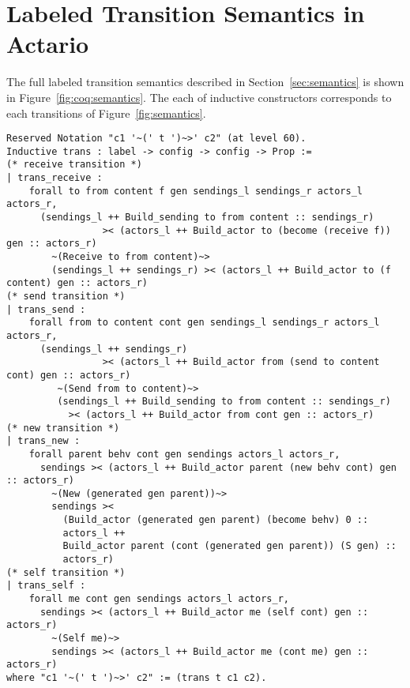 \appendix
\section{Labeled Transition Semantics in Actario}\label{app:lts}
The full labeled transition semantics described in Section~\ref{sec:semantics} is shown in Figure~\ref{fig:coq:semantics}.
The each of inductive constructors corresponds to each transitions of Figure~\ref{fig:semantics}.
\begin{figure*}[tb]
\begin{lstlisting}[style=small]
Reserved Notation "c1 '~(' t ')~>' c2" (at level 60).
Inductive trans : label -> config -> config -> Prop :=
(* receive transition *)
| trans_receive :
    forall to from content f gen sendings_l sendings_r actors_l actors_r,
      (sendings_l ++ Build_sending to from content :: sendings_r)
                 >< (actors_l ++ Build_actor to (become (receive f)) gen :: actors_r)
        ~(Receive to from content)~>
        (sendings_l ++ sendings_r) >< (actors_l ++ Build_actor to (f content) gen :: actors_r)
(* send transition *)
| trans_send :
    forall from to content cont gen sendings_l sendings_r actors_l actors_r,
      (sendings_l ++ sendings_r)
                 >< (actors_l ++ Build_actor from (send to content cont) gen :: actors_r)
         ~(Send from to content)~>
         (sendings_l ++ Build_sending to from content :: sendings_r)
           >< (actors_l ++ Build_actor from cont gen :: actors_r)
(* new transition *)
| trans_new :
    forall parent behv cont gen sendings actors_l actors_r,
      sendings >< (actors_l ++ Build_actor parent (new behv cont) gen :: actors_r)
        ~(New (generated gen parent))~>
        sendings ><
          (Build_actor (generated gen parent) (become behv) 0 ::
          actors_l ++
          Build_actor parent (cont (generated gen parent)) (S gen) ::
          actors_r)
(* self transition *)
| trans_self :
    forall me cont gen sendings actors_l actors_r,
      sendings >< (actors_l ++ Build_actor me (self cont) gen :: actors_r)
        ~(Self me)~>
        sendings >< (actors_l ++ Build_actor me (cont me) gen :: actors_r)
where "c1 '~(' t ')~>' c2" := (trans t c1 c2).
\end{lstlisting}
\caption{Labeled Transition Semantics in Actario}\label{fig:coq:semantics}
\end{figure*}

